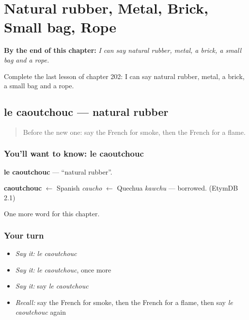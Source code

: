 
\chapter{Natural rubber, Metal, Brick, Small bag, Rope}
\label{ch:fr-natural-rubber-metal-brick-small-bag-rope}

\begin{chapteropening}
\textbf{By the end of this chapter:} \emph{I can say natural rubber, metal, a brick, a small bag and a rope.}

Complete the last lesson of chapter 202: I can say natural rubber, metal, a brick, a small bag and a rope.
\end{chapteropening}

\section[le caoutchouc]{le caoutchouc — natural rubber}

\label{lesson:FR-C202-caoutchouc}



\begin{quote}
Before the new one: say the French for smoke, then the French for a flame.
\end{quote}

\subsection*{You'll want to know: le caoutchouc}
\textbf{le caoutchouc} — \textquotedblleft{}natural rubber\textquotedblright{}.

\begin{cousinweb}
\textbf{caoutchouc} $\leftarrow$ Spanish \emph{caucho} $\leftarrow$ Quechua \emph{kawchu} — borrowed. (EtymDB 2.1)
\end{cousinweb}

\begin{grammarlens}[title={What you've built}]
One more word for this chapter.
\end{grammarlens}

\subsection*{Your turn}
\begin{itemize}
\raggedright
  \item \emph{Say it:} \emph{le caoutchouc}
  \item \emph{Say it:} \emph{le caoutchouc}, once more
  \item \emph{Say it:} say \emph{le caoutchouc}
  \item \emph{Recall:} say the French for smoke, then the French for a flame, then say \emph{le caoutchouc} again
\end{itemize}

